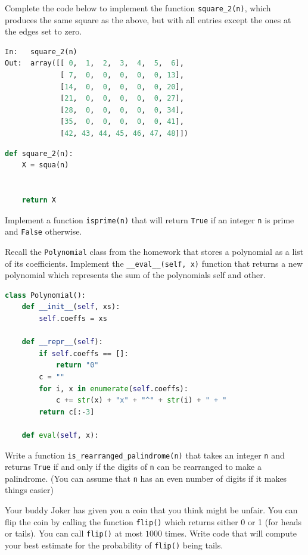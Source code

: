 \documentclass[addpoints,12pt]{exam}
\newcommand{\code}[1]{{\texttt{#1}}}
\begin{document}
\begin{questions}
\vfill

Complete the code below to implement the function \code{square\_2(n)}, which produces the same square as the above, but with all entries except the ones at the edges set to zero. 
\begin{lstlisting}[language=python]
In:   square_2(n) 
Out:  array([[ 0,  1,  2,  3,  4,  5,  6],
             [ 7,  0,  0,  0,  0,  0, 13],
             [14,  0,  0,  0,  0,  0, 20],
             [21,  0,  0,  0,  0,  0, 27],
             [28,  0,  0,  0,  0,  0, 34],
             [35,  0,  0,  0,  0,  0, 41],
             [42, 43, 44, 45, 46, 47, 48]]) 
\end{lstlisting}

\begin{lstlisting}[language=python]
def square_2(n):
    X = squa(n)
    
    
    return X
\end{lstlisting}

\vfill

\newpage
\question[20] Implement a function \code{isprime(n)} that will return \code{True} if an integer \code{n} is prime and \code{False} otherwise.  

\newpage
\question[20] Recall the \code{Polynomial} class from the homework that stores a polynomial as a list of its coefficients. Implement the \code{\_\_eval\_\_(self, x)} function that returns a new polynomial which represents the sum of the polynomials self and other.  


\begin{lstlisting}[language=python]
class Polynomial():
    def __init__(self, xs):
        self.coeffs = xs
    
    def __repr__(self):
        if self.coeffs == []:
            return "0"
        c = ""
        for i, x in enumerate(self.coeffs):
            c += str(x) + "x" + "^" + str(i) + " + "
        return c[:-3]
    
    def eval(self, x):
\end{lstlisting}

\newpage
\question[20] Write a function \code{is\_rearranged\_palindrome(n)} that takes an integer \code{n} and returns \code{True} if and only if the digits of \code{n} can be rearranged to make a palindrome. (You can assume that \code{n} has an even number of digits if it makes things easier) 


\newpage
\question[20] Your buddy Joker has given you a coin that you think might be unfair. You can flip the coin by calling the function \code{flip()} which returns either 0 or 1 (for heads or tails). You can call \code{flip()} at most $1000$ times. Write code that will compute your best estimate for the probability of \code{flip()} being tails.  



\end{questions}
\end{document}
